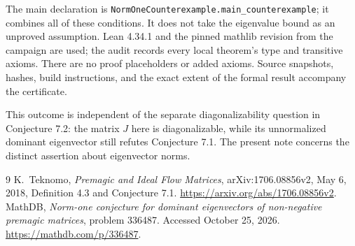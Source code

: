 \documentclass[11pt]{article}
\begin{document}
The main declaration is
\texttt{NormOneCounterexample.main\_counterexample}; it combines all of
these conditions. It does not take the eigenvalue bound as an unproved
assumption. Lean 4.34.1 and the pinned mathlib revision from the campaign
are used; the audit records every local theorem's type and transitive
axioms. There are no proof placeholders or added axioms. Source snapshots, hashes, build instructions, and the exact extent of the formal result
accompany the certificate.

This outcome is independent of the separate diagonalizability question
in Conjecture 7.2: the matrix $J$ here is diagonalizable, while its
unnormalized dominant eigenvector still refutes Conjecture 7.1. The present note concerns the distinct assertion about eigenvector norms.

\begin{thebibliography}{9}
 K.~Teknomo, \emph{Premagic and Ideal Flow Matrices},
arXiv:1706.08856v2, May 6, 2018, Definition 4.3 and Conjecture 7.1.
\url{https://arxiv.org/abs/1706.08856v2}.
 MathDB, \emph{Norm-one conjecture for dominant eigenvectors
of non-negative premagic matrices}, problem 336487. Accessed October 25,
2026. \url{https://mathdb.com/p/336487}.
\end{thebibliography}
\end{document}
